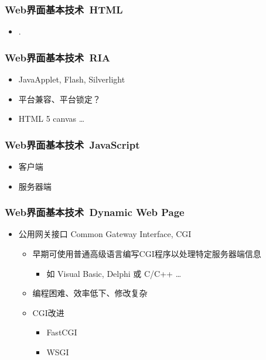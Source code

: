 \documentclass{beamer}
\begin{document}
\begin{frame}
	\frametitle{Web界面基本技术~{\small HTML}}
	\beamertemplatetransparentcovereddynamicmedium
	\begin{itemize}[<+->]
		\item .
	\end{itemize}
\end{frame}

\begin{frame}
	\frametitle{Web界面基本技术~{\small RIA}}
	\beamertemplatetransparentcovereddynamicmedium
	\begin{itemize}[<+->]
		\item JavaApplet, Flash, Silverlight
		\item 平台兼容、平台锁定？
		\item HTML 5 canvas \dots
	\end{itemize}
\end{frame}

\begin{frame}
	\frametitle{Web界面基本技术~{\small JavaScript}}
	\beamertemplatetransparentcovereddynamicmedium
	\begin{itemize}[<+->]
		\item 客户端
		\item 服务器端
	\end{itemize}
\end{frame}

\begin{frame}
	\frametitle{Web界面基本技术~{\small Dynamic Web Page}}
	\beamertemplatetransparentcovereddynamicmedium
	\begin{itemize}[<+->]
		\item 公用网关接口 Common Gateway Interface, CGI
		\begin{itemize}
			\item 早期可使用普通高级语言编写CGI程序以处理特定服务器端信息
			\begin{itemize}
				\item 如 Visual Basic, Delphi 或 C/C++ \dots
			\end{itemize}
			\item 编程困难、效率低下、修改复杂
			\item CGI改进
			\begin{itemize}
				\item FastCGI
				\item WSGI
			\end{itemize}
		\end{itemize}
	\end{itemize}
\end{frame}
\end{document}
